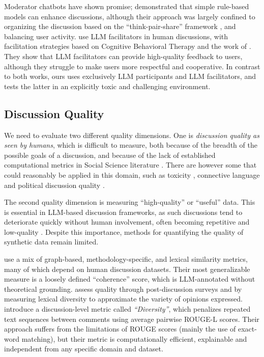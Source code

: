 Moderator chatbots have shown promise; \citet{kim_et_al_chatbot} demonstrated that simple rule-based models can enhance discussions, although their approach was largely confined to organizing the discussion based on the ``think-pair-share'' framework \cite{ahmad_2010_supporting, Navajas2018}, and balancing user activity. \citet{cho-etal-2024-language} use LLM facilitators in human discussions, with facilitation strategies based on Cognitive Behavioral Therapy and the work of \citet{rosenberg2015nonviolent}. They show that LLM facilitators can provide high-quality feedback to users, although they struggle to make users more respectful and cooperative.  In contrast to both works, ours uses exclusively LLM participants and LLM facilitators, and tests the latter in an explicitly toxic and challenging environment.


\subsection{Discussion Quality}
\label{ssec:related:quality}

We need to evaluate two different quality dimensions. One is \emph{discussion quality as seen by humans}, which is difficult to measure, both because of the breadth of the possible goals of a discussion, and because of the lack of established computational metrics in Social Science literature \cite{korre2025evaluation}. There are however some that could reasonably be applied in this domain, such as toxicity \citep{dekock2022disagree, XiaToxicity}, connective language \citep{lukito-etal-2024-comparing} and political discussion quality \citep{Jaidka_2022}.

The second quality dimension is measuring “high-quality” or “useful” data. This is essential in LLM-based discussion frameworks, as such discussions tend to deteriorate quickly without human involvement, often becoming repetitive and low-quality \citep{ulmer2024}. Despite this importance, methods for quantifying the quality of synthetic data remain limited.

 \citet{balog_2024} use a mix of graph-based, methodology-specific, and lexical similarity metrics, many of which depend on human discussion datasets. Their most generalizable measure is a loosely defined “coherence” score, which is LLM-annotated without theoretical grounding. \citet{kim_et_al_chatbot} assess quality through post-discussion surveys and by measuring lexical diversity to approximate the variety of opinions expressed. \citet{ulmer2024}  introduce a discussion-level metric called \emph{``Diversity''}, which penalizes repeated text sequences between comments using average pairwise ROUGE-L \citep{lin-2004-rouge} scores. Their approach suffers from the limitations of ROUGE scores (mainly the use of exact-word matching), but their metric is computationally efficient, explainable and independent from any specific domain and dataset.

